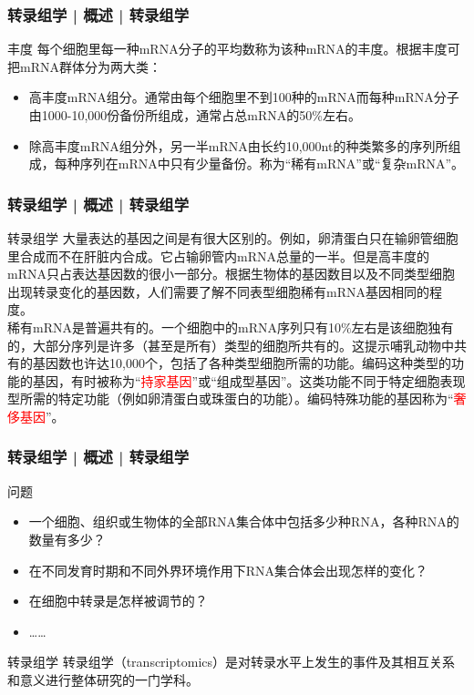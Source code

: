 \begin{frame}
  \frametitle{转录组学 | 概述 | 转录组学}
\begin{block}{丰度}
每个细胞里每一种mRNA分子的平均数称为该种mRNA的丰度。根据丰度可把mRNA群体分为两大类：
\begin{itemize}
  \item 高丰度mRNA组分。通常由每个细胞里不到100种的mRNA而每种mRNA分子由1000-10,000份备份所组成，通常占总mRNA的50\%左右。
  \item 除高丰度mRNA组分外，另一半mRNA由长约10,000nt的种类繁多的序列所组成，每种序列在mRNA中只有少量备份。称为“稀有mRNA”或“复杂mRNA”。
\end{itemize}
  \end{block}
\end{frame}

\begin{frame}
  \frametitle{转录组学 | 概述 | 转录组学}
  \begin{block}{转录组学}
大量表达的基因之间是有很大区别的。例如，卵清蛋白只在输卵管细胞里合成而不在肝脏内合成。它占输卵管内mRNA总量的一半。但是高丰度的mRNA只占表达基因数的很小一部分。根据生物体的基因数目以及不同类型细胞出现转录变化的基因数，人们需要了解不同表型细胞稀有mRNA基因相同的程度。\\
\vspace{1em}
稀有mRNA是普遍共有的。一个细胞中的mRNA序列只有10\%左右是该细胞独有的，大部分序列是许多（甚至是所有）类型的细胞所共有的。这提示哺乳动物中共有的基因数也许达10,000个，包括了各种类型细胞所需的功能。编码这种类型的功能的基因，有时被称为“\textcolor{red}{持家基因}”或“组成型基因”。这类功能不同于特定细胞表现型所需的特定功能（例如卵清蛋白或珠蛋白的功能）。编码特殊功能的基因称为“\textcolor{red}{奢侈基因}”。
  \end{block}
\end{frame}

\begin{frame}
  \frametitle{转录组学 | 概述 | 转录组学}
  \begin{block}{问题}
    \begin{itemize}
      \item 一个细胞、组织或生物体的全部RNA集合体中包括多少种RNA，各种RNA的数量有多少？
      \item 在不同发育时期和不同外界环境作用下RNA集合体会出现怎样的变化？
      \item 在细胞中转录是怎样被调节的？
      \item ……
    \end{itemize}
  \end{block}
  \pause
  \begin{block}{转录组学}
    转录组学（transcriptomics）是对转录水平上发生的事件及其相互关系和意义进行整体研究的一门学科。
  \end{block}
\end{frame}

